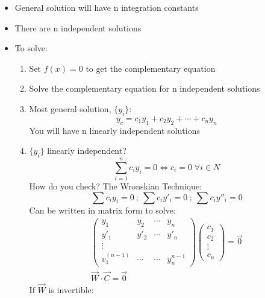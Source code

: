 \documentclass[Maths.tex]{subfiles}
\begin{document}
\begin{itemize}
    \item General solution will have n integration constants
    \item There are n independent solutions
    \item To solve:
    \begin{enumerate}
        \item Set $f(x) = 0$ to get the complementary equation
        \item Solve the complementary equation for n independent solutions
        \item Most general solution, $\{y_i\}$:
            \begin{equation}
                y_c = c_1y_1 + c_2y_2 + \cdots + c_ny_n
            \end{equation}
            You will have n linearly independent solutions
        \item $\{y_i\}$ linearly independent?
            \begin{equation}
                \sum_{i = 1}^{n}c_iy_i = 0 \iff c_i = 0 \;\forall i \in N
            \end{equation}
            How do you check? The Wronskian Technique:
            \begin{equation}
                \sum c_iy_i = 0 ~;~ \sum c_iy'_i = 0 ~;~ \sum c_iy''_i = 0
            \end{equation}
            Can be written in matrix form to solve:
            \begin{align}
                \begin{pmatrix}
                    y_1 & y_2 & \cdots & y_n \\
                    y'_1 & y'_2 & \cdots & y'_n \\
                    \vdots & & & \\
                    v^{(n - 1)}_{1} & \cdots & \cdots & y^{n - 1}_{n}
                \end{pmatrix}
                \begin{pmatrix}
                    c_1 \\
                    c_2 \\
                    \vdots \\
                    c_n
                \end{pmatrix} = \vec{0} \\ \vec{W} \cdot \vec{C} = \vec{0}
            \end{align}
            If $\vec{W}$ is invertible:

\end{enumerate}
\end{itemize}
\end{document}
